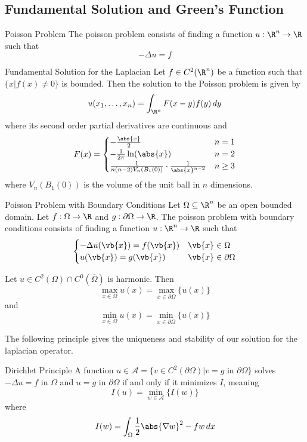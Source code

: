 \documentclass[a4paper]{article}
\begin{document}
\subsection{Fundamental Solution and Green's Function}
\begin{defn}{Poisson Problem}{} The poisson problem consists of finding a function $u:\R^n\to\R$ such that $$-\Delta u=f$$
\end{defn}

\begin{thm}{Fundamental Solution for the Laplacian}{} Let $f\in C^2(\R^n)$ be a function such that $\{x|f(x)\neq 0\}$ is bounded. Then the solution to the Poisson problem is given by $$u(x_1,\dots,x_n)=\int_{\R^n}F(x-y)f(y)\,dy$$ where its second order partial derivatives are continuous and $$F(x)=\begin{cases}
-\frac{\abs{x}}{2} & n=1\\
-\frac{1}{2\pi}\ln(\abs{x}) & n=2\\
\frac{1}{n(n-2)V_n(B_1(0))}\cdot\frac{1}{\abs{x}^{n-2}} & n\geq 3
\end{cases}$$ where $V_n(B_1(0))$ is the volume of the unit ball in $n$ dimensions. 
\end{thm}

\begin{defn}{Poisson Problem with Boundary Conditions}{} Let $\Omega\subseteq\R^n$ be an open bounded domain. Let $f:\Omega\to\R$ and $g:\partial\Omega\to\R$. The poisson problem with boundary conditions consists of finding a function $u:\R^n\to\R$ such that $$\begin{cases}
-\Delta u(\vb{x})=f(\vb{x}) & \vb{x}\in\Omega\\
u(\vb{x})=g(\vb{x}) & \vb{x}\in\partial\Omega
\end{cases}$$
\end{defn}

\begin{thm}{}{} Let $u\in C^2(\Omega)\cap C^0(\overline{\Omega})$ is harmonic. Then $$\max_{x\in\Omega}u(x)=\max_{x\in\partial\Omega}\{u(x)\}$$ and $$\min_{x\in\Omega}u(x)=\min_{x\in\partial\Omega}\{u(x)\}$$
\end{thm}

The following principle gives the uniqueness and stability of our solution for the laplacian operator. 

\begin{thm}{Dirichlet Principle}{} A function $u\in\mathcal{A}=\{v\in C^2(\partial\Omega)|v=g \text{ in }\partial\Omega\}$ solves $-\Delta u=f$ in $\Omega$ and $u=g$ in $\partial\Omega$ if and only if it minimizes $I$, meaning $$I(u)=\min_{w\in\mathcal{A}}\{I(w)\}$$ where $$I(w)=\int_{\Omega}\frac{1}{2}\abs{\nabla w}^2-fw\,dx$$
\end{thm}
\end{document}
